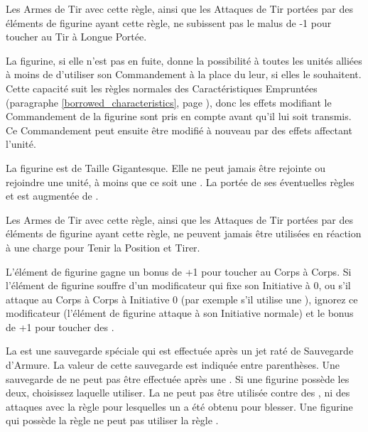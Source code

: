 
Les Armes de Tir avec cette règle, ainsi que les Attaques de Tir portées par des éléments de figurine ayant cette règle, ne subissent pas le malus de -1 pour toucher au Tir à Longue Portée.


La figurine, si elle n'est pas en fuite, donne la possibilité à toutes les unités alliées à moins de  d'utiliser son Commandement à la place du leur, si elles le souhaitent. Cette capacité suit les règles normales des Caractéristiques Empruntées (paragraphe \ref{borrowed_characteristics}, page \pageref{borrowed_characteristics}), donc les effets modifiant le Commandement de la figurine sont pris en compte avant qu'il lui soit transmis. Ce Commandement peut ensuite être modifié à nouveau par des effets affectant l'unité.


La figurine est de Taille Gigantesque. Elle ne peut jamais être rejointe ou rejoindre une unité, à moins que ce soit une \warplatform{}. La portée de ses éventuelles règles \inspiringpresence{} et \holdyourground{} est augmentée de .


Les Armes de Tir avec cette règle, ainsi que les Attaques de Tir portées par des éléments de figurine ayant cette règle, ne peuvent jamais être utilisées en réaction à une charge pour Tenir la Position et Tirer.


L'élément de figurine gagne un bonus de +1 pour toucher au Corps à Corps. Si l'élément de figurine souffre d'un modificateur qui fixe son Initiative à 0, ou s'il attaque au Corps à Corps à Initiative 0 (par exemple s'il utilise une \gw{}), ignorez ce modificateur (l'élément de figurine attaque à son Initiative normale) et le bonus de +1 pour toucher des \lightningreflexes{}.


La \regeneration{} est une sauvegarde spéciale qui est effectuée après un jet raté de Sauvegarde d'Armure. La valeur de cette sauvegarde est indiquée entre parenthèses. Une sauvegarde de \regeneration{} ne peut pas être effectuée après une \wardsave{}. Si une figurine possède les deux, choisissez laquelle utiliser. La \regeneration{} ne peut pas être utilisée contre des \flamingattacks{}, ni des attaques avec la règle  pour lesquelles un  a été obtenu pour blesser. Une figurine qui possède la règle \fireborn{} ne peut pas utiliser la règle \regeneration{}.

